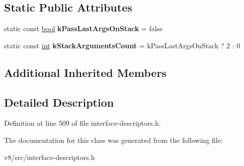 \subsection*{Static Public Attributes}
\begin{DoxyCompactItemize}
\item 
\mbox{\label{classv8_1_1internal_1_1StoreDescriptor_a6fde1b3765e579b50b20ef77583e9e21}} 
static const \mbox{\hyperlink{classbool}{bool}} {\bfseries k\+Pass\+Last\+Args\+On\+Stack} = false
\item 
\mbox{\label{classv8_1_1internal_1_1StoreDescriptor_a6de8d744480e15b502dceea3afebaa4d}} 
static const \mbox{\hyperlink{classint}{int}} {\bfseries k\+Stack\+Arguments\+Count} = k\+Pass\+Last\+Args\+On\+Stack ? 2 \+: 0
\end{DoxyCompactItemize}
\subsection*{Additional Inherited Members}


\subsection{Detailed Description}


Definition at line 509 of file interface-\/descriptors.\+h.



The documentation for this class was generated from the following file\+:\begin{DoxyCompactItemize}
\item 
v8/src/interface-\/descriptors.\+h\end{DoxyCompactItemize}
